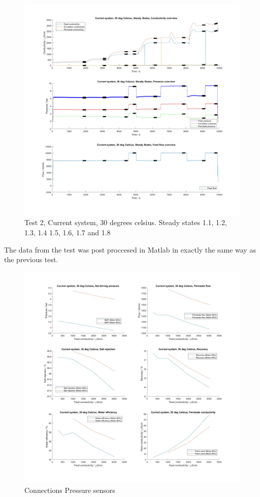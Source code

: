 \begin{figure}[H]
    \centering
    \includegraphics[width=1.1\textwidth]{overview30}
    \caption{Test 2, Current system, 30 degrees celsius. Steady states 1.1, 1.2, 1.3, 1.4 1.5, 1.6, 1.7 and 1.8}
    \label{fig:PressConn}
\end{figure}

\newpage



The data from the test was post proccesed in Matlab in exactly the same way as the previous test.

\begin{figure}[H]
    \centering
    \includegraphics[width=1.1\textwidth]{Key30}
    \caption{Connections Pressure sensors}
    \label{fig:PressConn}
\end{figure}

